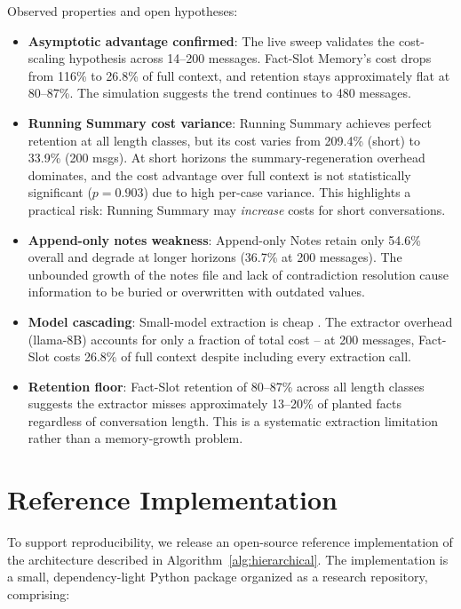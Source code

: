 \documentclass[conference]{IEEEtran}
\begin{document}
Observed properties and open hypotheses:
\begin{itemize}
    \item \textbf{Asymptotic advantage confirmed}: The live sweep validates the cost-scaling hypothesis across 14--200 messages. Fact-Slot Memory's cost drops from 116\% to 26.8\% of full context, and retention stays approximately flat at 80--87\%. The simulation suggests the trend continues to 480 messages.
    \item \textbf{Running Summary cost variance}: Running Summary achieves perfect retention at all length classes, but its cost varies from 209.4\% (short) to 33.9\% (200 msgs). At short horizons the summary-regeneration overhead dominates, and the cost advantage over full context is not statistically significant ($p=0.903$) due to high per-case variance. This highlights a practical risk: Running Summary may \emph{increase} costs for short conversations.
    \item \textbf{Append-only notes weakness}: Append-only Notes retain only 54.6\% overall and degrade at longer horizons (36.7\% at 200 messages). The unbounded growth of the notes file and lack of contradiction resolution cause information to be buried or overwritten with outdated values.
    \item \textbf{Model cascading}: Small-model extraction is cheap \cite{chen2023frugalgpt}. The extractor overhead (llama-8B) accounts for only a fraction of total cost -- at 200 messages, Fact-Slot costs 26.8\% of full context despite including every extraction call.
    \item \textbf{Retention floor}: Fact-Slot retention of 80--87\% across all length classes suggests the extractor misses approximately 13--20\% of planted facts regardless of conversation length. This is a systematic extraction limitation rather than a memory-growth problem.
\end{itemize}

\section{Reference Implementation}
\label{sec:implementation}

To support reproducibility, we release an open-source reference implementation of the architecture described in Algorithm~\ref{alg:hierarchical}. The implementation is a small, dependency-light Python package organized as a research repository, comprising:
\end{document}
